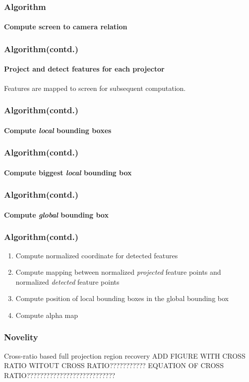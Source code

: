 \documentclass{beamer}
\begin{document}
\begin{frame}
\frametitle{Algorithm}
\framesubtitle{Compute screen to camera relation}
\end{frame}

\begin{frame}
\frametitle{Algorithm(contd.)}
\framesubtitle{Project and detect features for each projector}
Features are mapped to screen for subsequent computation.
\end{frame}

\begin{frame}
\frametitle{Algorithm(contd.)}
\framesubtitle{Compute \textit{local} bounding boxes}
\end{frame}

\begin{frame}
\frametitle{Algorithm(contd.)}
\framesubtitle{Compute biggest \textit{local} bounding box}
\end{frame}


\begin{frame}
\frametitle{Algorithm(contd.)}
\framesubtitle{Compute \textit{global} bounding box}
\end{frame}

\begin{frame}
\frametitle{Algorithm(contd.)}
\begin{enumerate}
\item Compute normalized coordinate for detected features
\item Compute mapping between normalized \textit{projected} feature points and normalized \textit{detected} feature points
\item Compute position of local bounding boxes in the global bounding box
\item Compute alpha map
\end{enumerate}
\end{frame}

\begin{frame}
\frametitle{Novelity}
Cross-ratio based full projection region recovery
ADD FIGURE WITH CROSS RATIO WITOUT CROSS RATIO???????????
EQUATION OF CROSS RATIO???????????????????????????
\end{frame}
\end{document}
